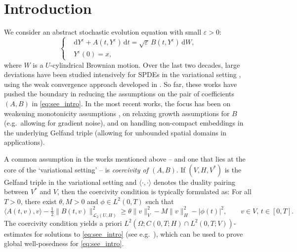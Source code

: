 \documentclass{amsart}
\newcommand{\dd}{\,\mathrm{d}}
\newcommand{\ddd}{\mathrm{d}}
\newcommand{\<}{\langle}
\newcommand{\?}{\rangle}
\theoremstyle{plain}
\theoremstyle{remark}
\theoremstyle{plain}
\numberwithin{equation}{section}
\newcommand{\Om}{\Omega}
\newcommand{\eps}{\varepsilon}
\begin{document}
\section{Introduction}  

We consider an abstract stochastic evolution equation with small $\eps>0$:
\begin{equation}
\label{eq:see_intro}
\left\{
\begin{aligned}
&\ddd Y^\varepsilon + A(t,Y^\varepsilon)\dd t=  \sqrt{\varepsilon} \, B(t,Y^\varepsilon)\dd W,\\
&Y^\varepsilon(0)=x,    
\end{aligned}
\right.
\end{equation} 
where $W$ is a $U$-cylindrical Brownian motion. 
Over the last two decades, large deviations have been studied intensively for SPDEs in the variational setting  \cite{liu09,hongliliu21,kumarmohan22,pan24,TV24}, using the weak convergence approach developed in \cite{budhidupuis01}. So far, these works have pushed the boundary in reducing the assumptions on the pair of coefficients $(A,B)$ in \eqref{eq:see_intro}. In the most recent works, the focus has been on weakening   monotonicity assumptions \cite{pan24,TV24}, on relaxing  growth assumptions for $B$ \cite{pan24,TV24} (e.g.\ allowing for gradient noise), and on handling non-compact embeddings in the underlying Gelfand triple \cite{kumarmohan22,TV24} (allowing for unbounded spatial  domains in applications). 
 
A common assumption in the works mentioned above -- and one that lies at the core of the `variational setting' --   is \emph{coercivity of $(A,B)$}. If $(V,H,V^*)$ is the Gelfand triple in the variational setting and  $\langle \cdot ,\cdot \rangle$ denotes the duality pairing between  $V^*$ and $V$, then 
the coercivity condition is typically formulated as:  
For all $T>0$, there exist $\theta, M>0$ and $\phi\in L^2(0,T)$ such that 
\begin{equation}\label{eq:def coercive}
\<A(t,v),v\?-\tfrac{1}{2}\|B(t,v)\|_{\mathscr{L}_2(U,H)}^2 \geq \theta\|v\|_V^2-M\|v\|_H^2-|\phi(t)|^2,\qquad v\in V,\, t\in[0,T]. 
\end{equation} 
The coercivity condition yields a priori $L^2(\Om;C(0,T;H)\cap L^2(0,T;V))$-estimates for solutions to \eqref{eq:see_intro} (see e.g.\ \cite{AV22variational,liurockner15}), which can be used to prove global well-posedness for \eqref{eq:see_intro}. 
\end{document}
